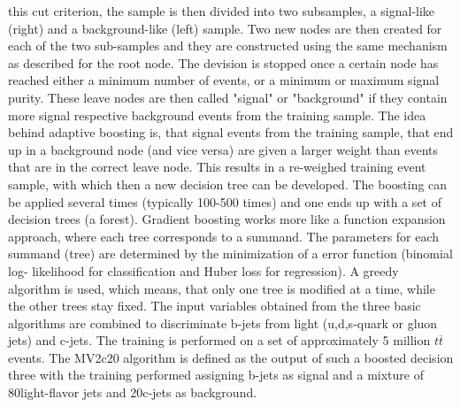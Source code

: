 this cut criterion, the sample is then divided into two subsamples, a
signal-like (right) and a background-like (left) sample. Two new nodes
are then created for each of the two sub-samples and they are
constructed using the same mechanism as described for the root
node. The devision is stopped once a certain node has reached either a
minimum number of events, or a minimum or maximum signal purity. These
leave nodes are then called "signal" or "background" if they contain
more signal respective background events from the training sample.
The idea behind adaptive boosting is, that signal events
from the training sample, that end up in a background node
(and vice versa) are given a larger weight than events that are in
the correct leave node. This results in a re-weighed training event
sample, with which then a new decision tree can be developed.
The boosting can be applied several times (typically 100-500 times)
and one ends up with a set of decision trees (a forest).
Gradient boosting works more like a function expansion approach, where
each tree corresponds to a summand. The parameters for each summand (tree)
are determined by the minimization of a error function (binomial log-
likelihood for classification and Huber loss for regression).
A greedy algorithm is used, which means, that only one tree is modified
at a time, while the other trees stay fixed.
The input variables obtained from the three basic algorithms are combined  to discriminate b-jets from light (u,d,s-quark or gluon jets) and c-jets. The training is
performed on a set of approximately 5 million $t\overline{t}$ events. The MV2c20 algorithm is defined as the output
of such a boosted decision three with the training performed assigning b-jets as signal and a mixture of 80\percent light-flavor
jets and 20\percent c-jets as background.
